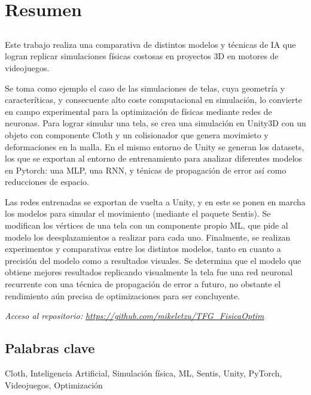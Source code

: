 \chapter*{Resumen}

\section*{\tituloPortadaVal}
Este trabajo realiza una comparativa de distintos modelos y técnicas de IA que logran replicar simulaciones físicas costosas en proyectos 3D en motores de videojuegos. \newline

Se toma como ejemplo el caso de las simulaciones de telas, cuya geometría y caracteríticas, y consecuente alto coste computacional en simulación, lo convierte en campo experimental para la optimización de físicas mediante redes de neuronas. Para lograr simular una tela, se crea una simulación en Unity3D con un objeto con componente Cloth y un colisionador que genera movimieto y deformaciones en la malla. En el mismo entorno de Unity se generan los datasets, los que se exportan al entorno de entrenamiento para analizar diferentes modelos en Pytorch: una MLP, una RNN, y ténicas de propagación de error así como reducciones de espacio.

Las redes entrenadas se exportan de vuelta a Unity, y en este se ponen en marcha los modelos para simular el movimiento (mediante el paquete Sentis). Se modifican los vértices de una tela con un componente propio ML, que pide al modelo los deesplazamientos a realizar para cada uno. Finalmente, se realizan experimentos y comparativas entre los distintos modelos, tanto en cuanto a precisión del modelo como a resultados visuales. Se determina que el modelo que obtiene mejores resultados replicando visualmente la tela fue una red neuronal recurrente con una técnica de propagación de error a futuro, no obstante el rendimiento aún precisa de optimizaciones para ser concluyente. \newline

\textit{Acceso al repositorio: \url{https://github.com/mikeletzu/TFG_FisicaOptim}}

\section*{Palabras clave}

\noindent Cloth, Inteligencia Artificial, Simulación física, ML, Sentis, Unity, PyTorch, Videojuegos, Optimización




